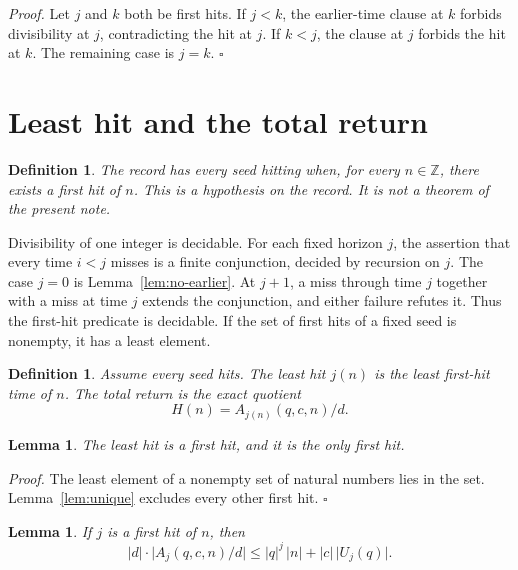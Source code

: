 \documentclass[11pt,letterpaper]{article}
\newcommand{\Z}{\mathbb{Z}}
\newtheorem{lemma}[theorem]{Lemma}
\newtheorem{definition}[theorem]{Definition}
\newenvironment{proof}{\noindent\textit{Proof.}}{\hfill\(\square\)}
\begin{document}
\begin{proof}
Let \(j\) and \(k\) both be first hits. If \(j<k\), the earlier-time clause at \(k\) forbids divisibility at \(j\), contradicting the hit at \(j\). If \(k<j\), the clause at \(j\) forbids the hit at \(k\). The remaining case is \(j=k\).
\end{proof}

\section{Least hit and the total return}

\begin{definition}
\label{def:every}
The record has every seed hitting when, for every \(n\in\Z\), there exists a first hit of \(n\). This is a hypothesis on the record. It is not a theorem of the present note.
\end{definition}

Divisibility of one integer is decidable. For each fixed horizon \(j\), the assertion that every time \(i<j\) misses is a finite conjunction, decided by recursion on \(j\). The case \(j=0\) is Lemma~\ref{lem:no-earlier}. At \(j+1\), a miss through time \(j\) together with a miss at time \(j\) extends the conjunction, and either failure refutes it. Thus the first-hit predicate is decidable. If the set of first hits of a fixed seed is nonempty, it has a least element.

\begin{definition}
\label{def:return}
Assume every seed hits. The least hit \(j(n)\) is the least first-hit time of \(n\). The total return is the exact quotient
\[
H(n)=A_{j(n)}(q,c,n)/d.
\]
\end{definition}

\begin{lemma}
\label{lem:least-is-hit}
The least hit is a first hit, and it is the only first hit.
\end{lemma}

\begin{proof}
The least element of a nonempty set of natural numbers lies in the set. Lemma~\ref{lem:unique} excludes every other first hit.
\end{proof}

\begin{lemma}
\label{lem:magnitude}
If \(j\) is a first hit of \(n\), then
\[
\lvert d\rvert\cdot\bigl\lvert A_j(q,c,n)/d\bigr\rvert
\le \lvert q\rvert^j\,\lvert n\rvert+\lvert c\rvert\,\lvert U_j(q)\rvert.
\]
\end{lemma}
\end{document}
